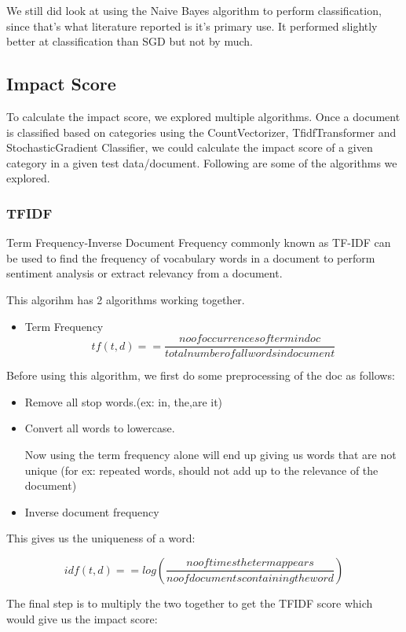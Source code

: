 \documentclass{article}
\begin{document}
We still did look at using the Naive Bayes algorithm to perform classification, since that's what literature reported is it's primary use. It performed slightly better at classification than SGD but not by much.

\subsection {Impact Score}
To calculate the impact score, we explored multiple algorithms. Once a document is classified based on categories using the CountVectorizer, TfidfTransformer and StochasticGradient Classifier, we could calculate the impact score of a given category in a given test data/document. Following are some of the algorithms we explored.
\subsubsection{TFIDF}
Term Frequency-Inverse Document Frequency commonly known as TF-IDF can be used to find the frequency of vocabulary words in a document to perform sentiment analysis or extract relevancy from a document.

This algorihm has 2 algorithms working together.
\begin{itemize}
\item {Term Frequency}
\[tf(t,d) =  = \frac{no of occurrences of term in doc }{total number of all words in document}\]
\end{itemize}

Before using this algorithm, we first do some preprocessing of the doc as follows:
\begin{itemize}
\item {Remove all stop words.(ex: in, the,are it)}
\item {Convert all words to lowercase.}

Now using the term frequency alone will end up giving us words that are not unique (for ex: repeated words, should not add up to the relevance of the document)
 \item Inverse document frequency
\end{itemize}

 This gives us the uniqueness of a word:

 \[idf(t,d) =  = log(\frac{no of times the term appears }{no of documents containing the word})\]

 The final step is to multiply the two together to get the TFIDF score which would give us the impact score:
\end{document}
